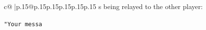 \documentclass{article}
\begin{document}
{\begin{supertabular}{c@{$\;$}|p{.15\linewidth}@{}p{.15\linewidth}p{.15\linewidth}p{.15\linewidth}p{.15\linewidth}p{.15\linewidth}}
{{{s being relayed to the other player:\\ \tt \\ \tt "Your messa}}}
\end{supertabular}}
\end{document}
